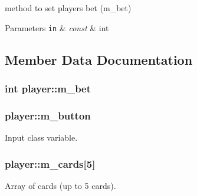 method to set players bet (m\-\_\-bet) 


\begin{DoxyParams}[1]{Parameters}
\mbox{\tt in}  & {\em const} & int \\
\hline
\end{DoxyParams}


\subsection{Member Data Documentation}
\hypertarget{classplayer_acf065485c206c03823772ab5cb52aadc}{
\subsubsection[{m\-\_\-bet}]{\setlength{\rightskip}{0pt plus 5cm}int player\-::m\-\_\-bet\hspace{0.3cm}{\ttfamily [private]}}}\label{classplayer_acf065485c206c03823772ab5cb52aadc}
\hypertarget{classplayer_a0efa90b86bd8b5277ef349f3dc651782}{
\subsubsection[{m\-\_\-button}]{ player\-::m\-\_\-button\hspace{0.3cm}{\ttfamily [private]}}}\label{classplayer_a0efa90b86bd8b5277ef349f3dc651782}


Input class variable. 

\hypertarget{classplayer_a05fe561ee0d66a696d766bd08f1daae9}{
\subsubsection[{m\-\_\-cards}]{ player\-::m\-\_\-cards\mbox{[}5\mbox{]}\hspace{0.3cm}{\ttfamily [private]}}}\label{classplayer_a05fe561ee0d66a696d766bd08f1daae9}


Array of cards (up to 5 cards). 


